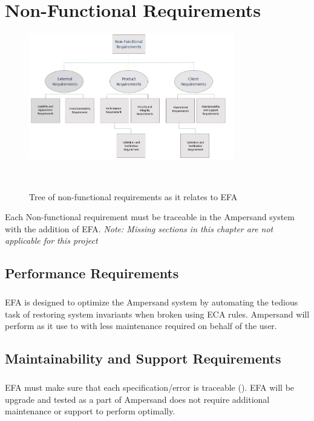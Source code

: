 \documentclass[12pt]{report}
\begin{document}
\chapter{Non-Functional Requirements}\label{ch:NonFunc}
\begin{figure}[!htb]
	\centering
	\includegraphics[width=0.8\textwidth]{../figures/NONFUNCTIONAL}
	\caption{Tree of non-functional requirements as it relates to 
	EFA}~\label{fig:figure2} 
\end{figure}
    Each Non-functional requirement must be traceable in the Ampersand system 
    with the addition of EFA. 
    \textit{Note: Missing sections in this chapter are not applicable for this 
    project }
\section{Performance Requirements}\label{sec:Performance}
\paragraph*{}
EFA is designed to optimize the Ampersand system by automating the tedious task 
of restoring system invariants when broken using ECA rules. Ampersand will 
perform as it use to with less maintenance required on behalf of the user.
\section{Maintainability and Support Requirements}\label{sec:Support}
\paragraph*{}
EFA must make sure that each specification/error is traceable 
(\cite[2]{derFun}). EFA will be upgrade and tested as a part of Ampersand does 
not require additional maintenance or support to perform optimally.
\end{document}
